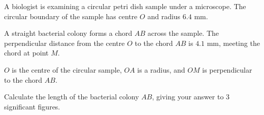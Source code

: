 \begin{question}
\noindent A biologist is examining a circular petri dish sample under a microscope. The circular boundary of the sample has centre $O$ and radius $6.4$ mm.

A straight bacterial colony forms a chord $AB$ across the sample. The perpendicular distance from the centre $O$ to the chord $AB$ is $4.1$ mm, meeting the chord at point $M$.

\begin{center}
\end{center}

\noindent $O$ is the centre of the circular sample, $OA$ is a radius, and $OM$ is perpendicular to the chord $AB$.

Calculate the length of the bacterial colony $AB$, giving your answer to 3 significant figures.

\vspace{4cm}

\begin{flushright}
\end{flushright}
\end{question}
